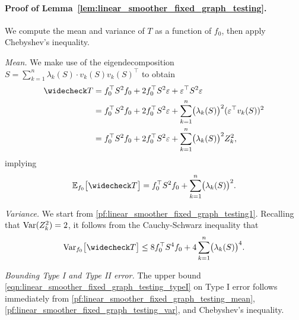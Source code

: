 \paragraph{Proof of Lemma~\ref{lem:linear_smoother_fixed_graph_testing}.}
We compute the mean and variance of $T$ as a function of $f_0$, then apply Chebyshev's inequality.

\textit{Mean.} We make use of the eigendecomposition $S = \sum_{k = 1}^{n} \lambda_k(S) \cdot v_k(S) v_k(S)^{\top}$ to obtain
\begin{equation}
\label{pf:linear_smoother_fixed_graph_testing1}
\begin{aligned}
\wc{T} & = f_0^{\top} S^2 f_0 + 2 f_0^{\top} S^2 \varepsilon + \varepsilon^{\top} S^2 \varepsilon \\
& = f_0^{\top} S^2 f_0 + 2 f_0^{\top} S^2 \varepsilon + \sum_{k = 1}^{n}  \bigl(\lambda_k(S)\bigr)^2 (\varepsilon^{\top} v_k(S))^2 \\
& = f_0^{\top} S^2 f_0 + 2 f_0^{\top} S^2 \varepsilon + \sum_{k = 1}^{n}  \bigl(\lambda_k(S)\bigr)^2 Z_k^2,
\end{aligned}
\end{equation}
implying
\begin{equation}
\label{pf:linear_smoother_fixed_graph_testing_mean}
\Ebb_{f_0}\bigl[\wc{T}\bigr] = f_0^{\top} S^2 f_0 + \sum_{k = 1}^{n} \bigl(\lambda_k(S)\bigr)^2.
\end{equation}

\textit{Variance.} We start from \eqref{pf:linear_smoother_fixed_graph_testing1}. Recalling that $\mathrm{Var}(Z_k^2) = 2$, it follows from the Cauchy-Schwarz inequality that
\begin{equation}
\label{pf:linear_smoother_fixed_graph_testing_var}
\Var_{f_0}\bigl[\wc{T}\bigr] \leq 8 f_0^{\top} S^4 f_0 + 4 \sum_{k = 1}^{n} \bigl(\lambda_k(S)\bigr)^4.
\end{equation}

\textit{Bounding Type I and Type II error.} The upper bound \eqref{eqn:linear_smoother_fixed_graph_testing_typeI} on Type I error follows immediately from \eqref{pf:linear_smoother_fixed_graph_testing_mean}, \eqref{pf:linear_smoother_fixed_graph_testing_var}, and Chebyshev's inequality.

